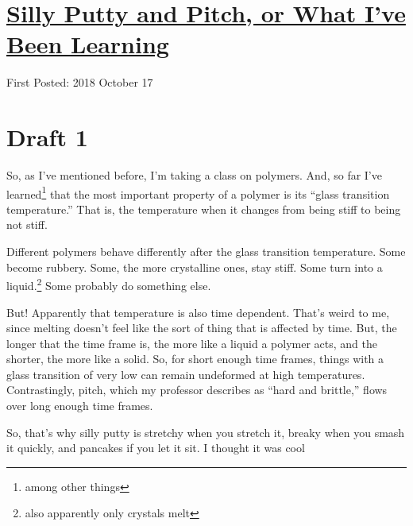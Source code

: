 \documentclass[12pt]{article}[titlepage]
\newcommand{\say}[1]{``#1''}
\newcommand{\1}{\={a}}
\newcommand{\2}{\={e}}
\newcommand{\3}{\={\i}}
\newcommand{\4}{\=o}
\newcommand{\5}{\=u}
\newcommand{\6}{\={A}}
\renewcommand{\,}{\textsuperscript{,}}
\begin{document}
\doublespacing
\section{\href{silly-putty-and-pitch.html}{Silly Putty and Pitch, or What I've Been Learning}}
First Posted: 2018 October 17
\section{Draft 1}
So, as I've mentioned before, I'm taking a class on polymers.
And, so far I've learned\footnote{among other things} that the most important property of a polymer is its \say{glass transition temperature.}
That is, the temperature when it changes from being stiff to being not stiff.

Different polymers behave differently after the glass transition temperature.
Some become rubbery.
Some, the more crystalline ones, stay stiff.
Some turn into a liquid.\footnote{also apparently only crystals melt}
Some probably do something else.

But!
Apparently that temperature is also time dependent.
That's weird to me, since melting doesn't feel like the sort of thing that is affected by time.
But, the longer that the time frame is, the more like a liquid a polymer acts, and the shorter, the more like a solid.
So, for short enough time frames, things with a glass transition of very low can remain undeformed at high temperatures.
Contrastingly, pitch, which my professor describes as \say{hard and brittle,} flows over long enough time frames.

So, that's why silly putty is stretchy when you stretch it, breaky when you smash it quickly, and pancakes if you let it sit.
I thought it was cool
\end{document}
